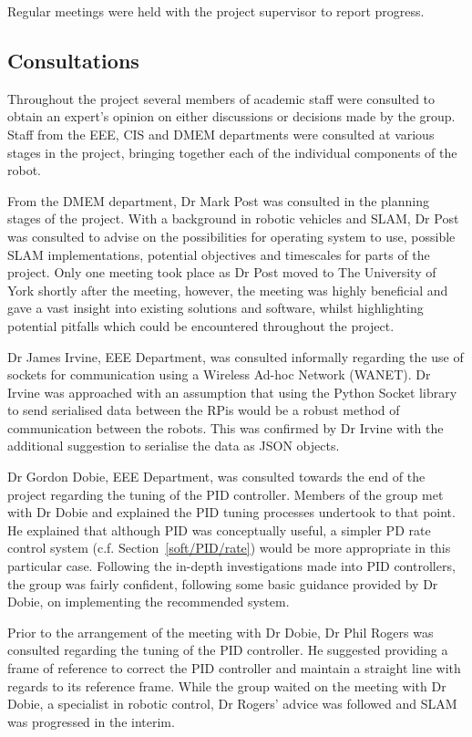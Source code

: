Regular meetings were held with the project supervisor to report progress.

\subsection{Consultations}\label{pm/consultations}
Throughout the project several members of academic staff
were consulted to obtain an expert's opinion on either
discussions or decisions made by the group.
Staff from the EEE, CIS and DMEM departments were
consulted at various stages in the project, bringing together
each of the individual components of the robot.

From the DMEM department, Dr Mark Post
was consulted in the planning stages of the project. With a
background in robotic vehicles and SLAM, Dr Post was consulted
to advise on the possibilities for operating system to use,
possible SLAM implementations, potential objectives and
timescales for parts of the project. Only one meeting took place
as Dr Post moved to The University of York shortly after the meeting,
however, the meeting was highly beneficial and gave a vast
insight into existing solutions and software, whilst highlighting
potential pitfalls which could be encountered throughout
the project.

Dr James Irvine, EEE Department, was consulted informally
regarding the use of sockets for communication using a Wireless
Ad-hoc Network (WANET). Dr Irvine was approached with an
assumption that using the Python Socket library to send
serialised data between the RPis would be a robust
method of communication between the robots. This was confirmed
by Dr Irvine with the additional suggestion to serialise the data
as JSON objects.


Dr Gordon Dobie, EEE Department, was consulted towards the end
of the project regarding the tuning of the PID controller.
Members of the group met with Dr Dobie and explained the PID tuning
processes undertook to that point. He explained that although
PID was conceptually useful, a simpler PD rate control system (c.f. Section~\ref{soft/PID/rate}) would be more appropriate
in this particular case. Following the in-depth investigations made
into PID controllers, the group was fairly confident, following some
basic guidance provided by Dr Dobie, on implementing the
recommended system.

Prior to the arrangement of the meeting with Dr Dobie, Dr Phil
Rogers was consulted regarding the tuning of the PID controller.
He suggested providing a frame of reference to correct
the PID controller and maintain a straight line with regards to
its reference frame. While the group waited on the meeting with
Dr Dobie, a specialist in robotic control, Dr Rogers' advice was
followed and SLAM was progressed in the interim.

